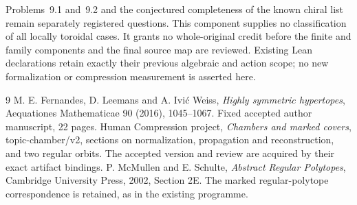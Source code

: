\documentclass[11pt,a4paper]{article}
\begin{document}
Problems~9.1 and~9.2 and the conjectured completeness of the known chiral
list remain separately registered questions.  This component supplies no
classification of all locally toroidal cases.  It grants no whole-original
credit before the finite and family components and the final source map
are reviewed.  Existing Lean declarations retain exactly their previous
algebraic and action scope; no new formalization or compression measurement
is asserted here.

\begin{thebibliography}{9}
 M. E. Fernandes, D. Leemans and A. Ivi\'c Weiss,
\emph{Highly symmetric hypertopes}, Aequationes Mathematicae 90 (2016),
1045--1067. Fixed accepted author manuscript, 22 pages.
 Human Compression project, \emph{Chambers and marked covers},
topic-chamber/v2, sections on normalization, propagation and reconstruction,
and two regular orbits. The accepted version and review are acquired by
their exact artifact bindings.
 P. McMullen and E. Schulte, \emph{Abstract Regular Polytopes},
Cambridge University Press, 2002, Section 2E. The marked regular-polytope
correspondence is retained, as in the existing programme.
\end{thebibliography}
\end{document}

